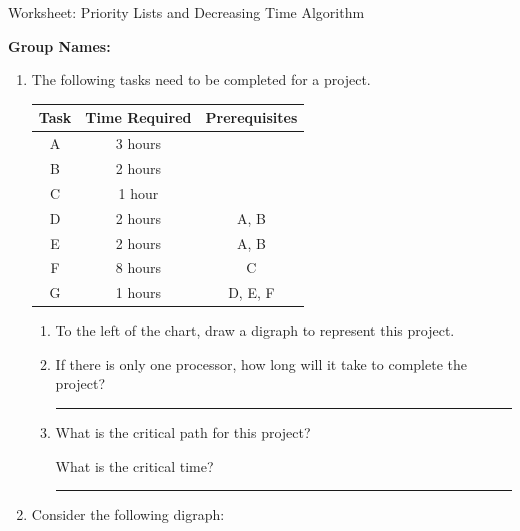 \documentclass[12pt]{article}
\newcommand{\ans}[1][1in]{\rule{#1}{.5pt}}
\newcommand{\be}{\begin{enumerate}}
\newcommand{\ee}{\end{enumerate}}
\begin{document}
\begin{center}
{\Large  Worksheet:  Priority Lists and Decreasing Time Algorithm	}
\end{center}



\noindent \textbf{Group Names:} \hrulefill \\
\begin{enumerate}

\item The following tasks need to be completed for a project.

    \begin{tabular}{|c|c|c|}
      \hline
      {\bf Task} & {\bf Time Required} & {\bf Prerequisites} \\
      \hline
      A & 3 hours &  \\
      \hline
      B & 2 hours & \\
      \hline
      C & 1 hour & \\
      \hline
      D & 2 hours & A, B \\
      \hline
      E & 2 hours & A, B \\
      \hline
      F & 8 hours & C \\
      \hline
      G & 1 hours & D, E, F \\
      \hline
    \end{tabular}
  \be
  \item
 To the left of the chart, draw a digraph to represent this project.
    \item If there is only one processor, how long will it take to complete the project? \ans
    
    \item  What is the critical path for this project? \hrulefill 

What is the critical time? \ans
   
\ee
\item Consider the following digraph:

\newcommand{\mydigraph}{\begin{tikzpicture}[vtx/.style={draw, circle, inner sep = 3pt, font = \scriptsize}, myto/.style={-latex, shorten >=2pt, shorten <=2pt
}, node distance = \r cm]
\node[vtx, label=above:{\scriptsize $A(10)$}, ] (T1) at (0,0){};
\node[vtx, right =of T1, label=above:{\scriptsize $B(7)$}] (T2) {};
\node[vtx, right =of T2, label=above:{\scriptsize $C(4)$}] (T3) {};
\node[vtx, below = \s cm of T1, label=above:{\scriptsize $D(9)$}] (T4) {};
\node[vtx, right =of T4, label=above left:{\scriptsize $E(5)$}] (T5) {};
\node[vtx, right =of T5, label= right:{\scriptsize $F(4)$}] (T6) {};
\node[vtx, below =\s cm of T4, label=below:{\scriptsize $G(13)$}] (T7) {};
\node[vtx, right =of T7, label=below:{\scriptsize $H(4)$}] (T8) {};
\node[vtx, right =of T8, label=below:{\scriptsize $I(6)$}] (T9) {};


\end{tikzpicture}}
\end{enumerate}
\end{document}
